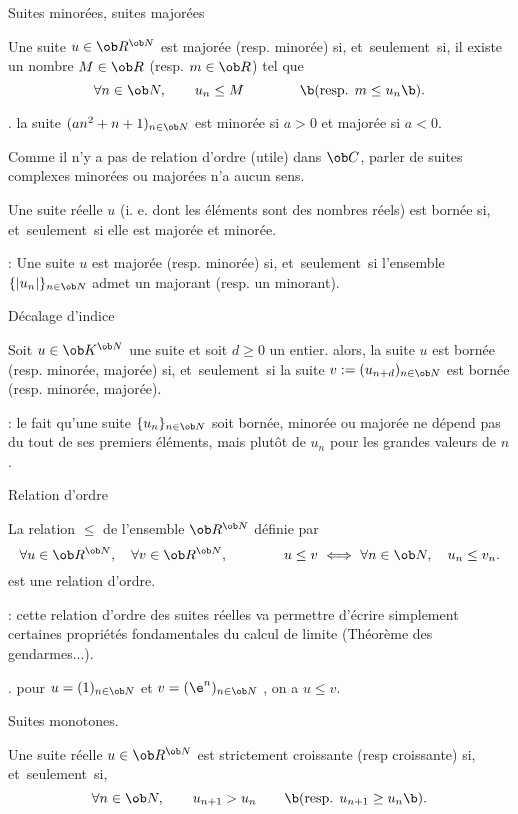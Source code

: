 \Concept [] Suites minor\'ees, suites major\'ees

\Definition []  Une suite $u\in\ob R^{\ob N}$ est major\'ee (resp. minor\'ee) si, et~seulement~si, 
il existe un nombre $M\in\ob R$ (resp. $m\in\ob R$) tel que 
$$
\forall n\in\ob N ,\qquad  u_n\le M \qquad \qquad\b(\mbox{resp. } m\le u_n\b).
$$

\Exemple. la suite $(a n^2+n+1)_{n\in\ob N}$ est minor\'ee si $a> 0$ et major\'ee si $a< 0$. 
\bigskip

 Comme il n'y a pas de relation d'ordre (utile) dans $\ob C$, 
parler de suites complexes minor\'ees ou major\'ees n'a aucun sens. 
\bigskip

\Propriete []  Une suite r\'eelle $u$ (i. e. dont les \'el\'ements sont des nombres r\'eels) est born\'ee si, et~seulement~si elle est major\'ee et minor\'ee. 
\bigskip

\Remarque : Une suite $u$ est major\'ee (resp. minor\'ee) si, et~seulement~si l'ensemble $\{|u_n|\}_{n\in\ob N}$ 
admet un majorant (resp. un minorant). 
\bigskip

\Concept [] D\'ecalage d'indice

\Propriete []  Soit $u\in\ob K^{\ob N}$ une suite et soit $d\ge0$ un entier. alors, la suite $u$ est born\'ee (resp. minor\'ee, major\'ee) si, et~seulement~si 
la suite $v:=(u_{n+d})_{n\in\ob N}$ est born\'ee (resp. minor\'ee, major\'ee). 
\bigskip

\Remarque : le fait qu'une suite $\{u_n\}_{n\in\ob N}$ soit born\'ee, minor\'ee ou major\'ee ne d\'epend pas du tout de ses premiers \'el\'ements, mais plut\^ot de $u_n$ pour les grandes valeurs de $n$. 
\bigskip


\Concept [] Relation d'ordre

\Definition []  La relation $\le$ de l'ensemble $\ob R^{\ob N}$ d\'efinie par 
$$
\forall u\in\ob R^{\ob N}, \quad\forall v\in\ob R^{\ob N}, \qquad\qquad u\le v\ \Longleftrightarrow \ \forall
n\in\ob N, \quad u_n\le v_n.  
$$
est une relation d'ordre. \bigskip

\Remarque : cette relation d'ordre des suites r\'eelles va permettre d'\'ecrire simplement certaines propri\'et\'es fondamentales du calcul de limite (Th\'eor\`eme des gendarmes...). 
\bigskip

\Exemple. pour $u=(1)_{n\in\ob N}$ et $v=(\e^n)_{n\in\ob N}$ , on a $u\le v$. 
\bigskip

\Concept [] Suites monotones.

\Definition []  Une suite r\'eelle $u\in\ob R^{\ob N}$ est strictement croissante (resp croissante) si, et~seulement~si,
$$
\forall n\in\ob N, \qquad {u_{n+1}> u_n}\qquad\b(\mbox{resp. }{u_{n+1}\ge u_n}\b).
$$


